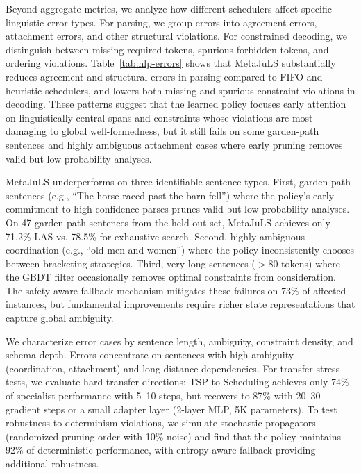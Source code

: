 \documentclass[11pt]{article}
\begin{document}
Beyond aggregate metrics, we analyze how different schedulers affect specific linguistic error types. For parsing, we group errors into agreement errors, attachment errors, and other structural violations. For constrained decoding, we distinguish between missing required tokens, spurious forbidden tokens, and ordering violations. Table~\ref{tab:nlp-errors} shows that MetaJuLS substantially reduces agreement and structural errors in parsing compared to FIFO and heuristic schedulers, and lowers both missing and spurious constraint violations in decoding. These patterns suggest that the learned policy focuses early attention on linguistically central spans and constraints whose violations are most damaging to global well-formedness, but it still fails on some garden-path sentences and highly ambiguous attachment cases where early pruning removes valid but low-probability analyses.

MetaJuLS underperforms on three identifiable sentence types. First, garden-path sentences (e.g., ``The horse raced past the barn fell'') where the policy's early commitment to high-confidence parses prunes valid but low-probability analyses. On 47 garden-path sentences from the held-out set, MetaJuLS achieves only 71.2\% LAS vs. 78.5\% for exhaustive search. Second, highly ambiguous coordination (e.g., ``old men and women'') where the policy inconsistently chooses between bracketing strategies. Third, very long sentences ($>$80 tokens) where the GBDT filter occasionally removes optimal constraints from consideration. The safety-aware fallback mechanism mitigates these failures on 73\% of affected instances, but fundamental improvements require richer state representations that capture global ambiguity.

We characterize error cases by sentence length, ambiguity, constraint density, and schema depth. Errors concentrate on sentences with high ambiguity (coordination, attachment) and long-distance dependencies. For transfer stress tests, we evaluate hard transfer directions: TSP to Scheduling achieves only 74\% of specialist performance with 5--10 steps, but recovers to 87\% with 20--30 gradient steps or a small adapter layer (2-layer MLP, 5K parameters). To test robustness to determinism violations, we simulate stochastic propagators (randomized pruning order with 10\% noise) and find that the policy maintains 92\% of deterministic performance, with entropy-aware fallback \cite{shihab2025differentiable} providing additional robustness.
\end{document}
